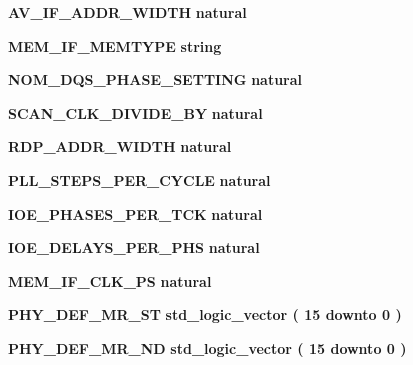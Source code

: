 \begin{DoxyCompactItemize}
\item 
{\bf A\+V\+\_\+\+I\+F\+\_\+\+A\+D\+D\+R\+\_\+\+W\+I\+D\+TH} {\bfseries {\bfseries \textcolor{comment}{natural}\textcolor{vhdlchar}{ }}}
\item 
{\bf M\+E\+M\+\_\+\+I\+F\+\_\+\+M\+E\+M\+T\+Y\+PE} {\bfseries {\bfseries \textcolor{comment}{string}\textcolor{vhdlchar}{ }}}
\item 
{\bf N\+O\+M\+\_\+\+D\+Q\+S\+\_\+\+P\+H\+A\+S\+E\+\_\+\+S\+E\+T\+T\+I\+NG} {\bfseries {\bfseries \textcolor{comment}{natural}\textcolor{vhdlchar}{ }}}
\item 
{\bf S\+C\+A\+N\+\_\+\+C\+L\+K\+\_\+\+D\+I\+V\+I\+D\+E\+\_\+\+BY} {\bfseries {\bfseries \textcolor{comment}{natural}\textcolor{vhdlchar}{ }}}
\item 
{\bf R\+D\+P\+\_\+\+A\+D\+D\+R\+\_\+\+W\+I\+D\+TH} {\bfseries {\bfseries \textcolor{comment}{natural}\textcolor{vhdlchar}{ }}}
\item 
{\bf P\+L\+L\+\_\+\+S\+T\+E\+P\+S\+\_\+\+P\+E\+R\+\_\+\+C\+Y\+C\+LE} {\bfseries {\bfseries \textcolor{comment}{natural}\textcolor{vhdlchar}{ }}}
\item 
{\bf I\+O\+E\+\_\+\+P\+H\+A\+S\+E\+S\+\_\+\+P\+E\+R\+\_\+\+T\+CK} {\bfseries {\bfseries \textcolor{comment}{natural}\textcolor{vhdlchar}{ }}}
\item 
{\bf I\+O\+E\+\_\+\+D\+E\+L\+A\+Y\+S\+\_\+\+P\+E\+R\+\_\+\+P\+HS} {\bfseries {\bfseries \textcolor{comment}{natural}\textcolor{vhdlchar}{ }}}
\item 
{\bf M\+E\+M\+\_\+\+I\+F\+\_\+\+C\+L\+K\+\_\+\+PS} {\bfseries {\bfseries \textcolor{comment}{natural}\textcolor{vhdlchar}{ }}}
\item 
{\bf P\+H\+Y\+\_\+\+D\+E\+F\+\_\+\+M\+R\+\_\+ST} {\bfseries {\bfseries \textcolor{comment}{std\+\_\+logic\+\_\+vector}\textcolor{vhdlchar}{ }\textcolor{vhdlchar}{(}\textcolor{vhdlchar}{ }\textcolor{vhdlchar}{ } \textcolor{vhdldigit}{15} \textcolor{vhdlchar}{ }\textcolor{keywordflow}{downto}\textcolor{vhdlchar}{ }\textcolor{vhdlchar}{ } \textcolor{vhdldigit}{0} \textcolor{vhdlchar}{ }\textcolor{vhdlchar}{)}\textcolor{vhdlchar}{ }}}
\item 
{\bf P\+H\+Y\+\_\+\+D\+E\+F\+\_\+\+M\+R\+\_\+ND} {\bfseries {\bfseries \textcolor{comment}{std\+\_\+logic\+\_\+vector}\textcolor{vhdlchar}{ }\textcolor{vhdlchar}{(}\textcolor{vhdlchar}{ }\textcolor{vhdlchar}{ } \textcolor{vhdldigit}{15} \textcolor{vhdlchar}{ }\textcolor{keywordflow}{downto}\textcolor{vhdlchar}{ }\textcolor{vhdlchar}{ } \textcolor{vhdldigit}{0} \textcolor{vhdlchar}{ }\textcolor{vhdlchar}{)}\textcolor{vhdlchar}{ }}}

\end{DoxyCompactItemize}
